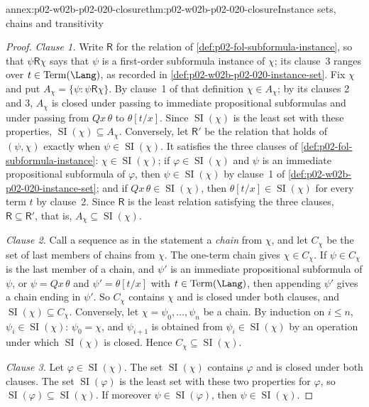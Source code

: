 \begin{annexitem}{annex:p02-w02b-p02-020-closure}{thm:p02-w02b-p02-020-closure}{Instance sets, chains and transitivity}
\begin{proof}
\emph{Clause 1.}  Write \(\mathrel{\mathsf R}\) for the relation of
\cref{def:p02-fol-subformula-instance}, so that \(\psi\mathrel{\mathsf R}\chi\)
says that \(\psi\) is a first-order subformula instance of \(\chi\); its
clause~3 ranges over \(t\in\operatorname{Term}(\Lang)\), as recorded in
\cref{def:p02-w02b-p02-020-instance-set}.  Fix \(\chi\) and put
\(A_\chi=\{\psi:\psi\mathrel{\mathsf R}\chi\}\).  By clause~1 of that
definition \(\chi\in A_\chi\); by its clauses 2 and 3, \(A_\chi\) is closed
under passing to immediate propositional subformulas and under passing from
\(Qx\,\theta\) to \(\theta[t/x]\).  Since \(\operatorname{SI}(\chi)\) is the
least set with these properties, \(\operatorname{SI}(\chi)\subseteq A_\chi\).
Conversely, let \(\mathsf R'\) be the relation that holds of \((\psi,\chi)\)
exactly when \(\psi\in\operatorname{SI}(\chi)\).  It satisfies the three
clauses of \cref{def:p02-fol-subformula-instance}: \(\chi\in
\operatorname{SI}(\chi)\); if \(\varphi\in\operatorname{SI}(\chi)\) and
\(\psi\) is an immediate propositional subformula of \(\varphi\), then
\(\psi\in\operatorname{SI}(\chi)\) by clause~1 of
\cref{def:p02-w02b-p02-020-instance-set}; and if
\(Qx\,\theta\in\operatorname{SI}(\chi)\), then
\(\theta[t/x]\in\operatorname{SI}(\chi)\) for every term \(t\) by clause~2.
Since \(\mathsf R\) is the least relation satisfying the three clauses,
\(\mathsf R\subseteq\mathsf R'\), that is, \(A_\chi\subseteq
\operatorname{SI}(\chi)\).

\emph{Clause 2.}  Call a sequence as in the statement a \emph{chain} from
\(\chi\), and let \(C_\chi\) be the set of last members of chains from
\(\chi\).  The one-term chain gives \(\chi\in C_\chi\).  If \(\psi\in C_\chi\)
is the last member of a chain, and \(\psi'\) is an immediate propositional
subformula of \(\psi\), or \(\psi=Qx\,\theta\) and \(\psi'=\theta[t/x]\) with
\(t\in\operatorname{Term}(\Lang)\), then appending \(\psi'\) gives a chain
ending in \(\psi'\).  So \(C_\chi\) contains \(\chi\) and is closed under both
clauses, and \(\operatorname{SI}(\chi)\subseteq C_\chi\).  Conversely, let
\(\chi=\psi_0,\ldots,\psi_n\) be a chain.  By induction on \(i\le n\),
\(\psi_i\in\operatorname{SI}(\chi)\): \(\psi_0=\chi\), and \(\psi_{i+1}\) is
obtained from \(\psi_i\in\operatorname{SI}(\chi)\) by an operation under which
\(\operatorname{SI}(\chi)\) is closed.  Hence \(C_\chi\subseteq
\operatorname{SI}(\chi)\).

\emph{Clause 3.}  Let \(\varphi\in\operatorname{SI}(\chi)\).  The set
\(\operatorname{SI}(\chi)\) contains \(\varphi\) and is closed under both
clauses.  The set \(\operatorname{SI}(\varphi)\) is the least set with these
two properties for \(\varphi\), so
\(\operatorname{SI}(\varphi)\subseteq\operatorname{SI}(\chi)\).  If moreover
\(\psi\in\operatorname{SI}(\varphi)\), then \(\psi\in\operatorname{SI}(\chi)\).
\end{proof}
\end{annexitem}

